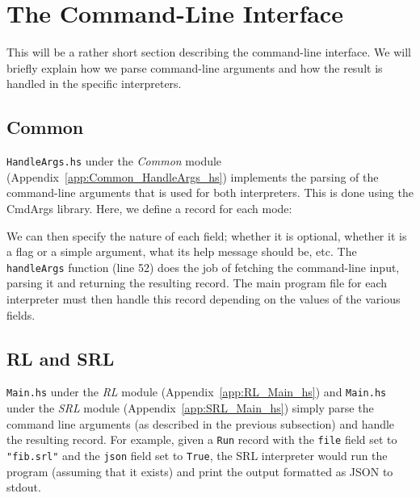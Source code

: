 \newpage
\section{The Command-Line Interface}
\label{sec:implementation_cli}

This will be a rather short section describing the command-line interface. We will briefly explain how we parse command-line arguments and how the result is handled in the specific interpreters.

\subsection{Common}

\texttt{HandleArgs.hs} under the \textit{Common} module (Appendix~\ref{app:Common_HandleArgs_hs}) implements the parsing of the command-line arguments that is used for both interpreters. This is done using the CmdArgs library. Here, we define a record for each mode:

We can then specify the nature of each field; whether it is optional, whether it is a flag or a simple argument, what its help message should be, etc. The \texttt{handleArgs} function (line 52) does the job of fetching the command-line input, parsing it and returning the resulting record. The main program file for each interpreter must then handle this record depending on the values of the various fields.

\subsection{RL and SRL}
\texttt{Main.hs} under the \textit{RL} module (Appendix~\ref{app:RL_Main_hs}) and \texttt{Main.hs} under the \textit{SRL} module (Appendix~\ref{app:SRL_Main_hs}) simply parse the command line arguments (as described in the previous subsection) and handle the resulting record. For example, given a \texttt{Run} record with the \texttt{file} field set to \texttt{"fib.srl"} and the \texttt{json} field set to \texttt{True}, the SRL interpreter would run the program (assuming that it exists) and print the output formatted as JSON to stdout.

